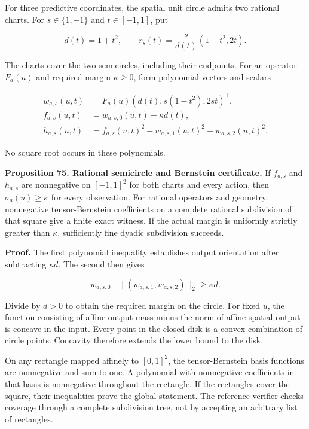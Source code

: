 For three predictive coordinates, the spatial unit circle admits two
rational charts. For \(s\in\{1,-1\}\) and \(t\in[-1,1]\), put

\[
d(t)=1+t^2,\qquad
r_s(t)=\frac{s}{d(t)}(1-t^2,2t).
\]

The charts cover the two semicircles, including their endpoints. For an
operator \(F_a(u)\) and required margin \(\kappa\geq0\), form polynomial
vectors and scalars

\[
\begin{aligned}
w_{a,s}(u,t)&=F_a(u)(d(t),s(1-t^2),2st)^{\mathsf T},\\
f_{a,s}(u,t)&=w_{a,s,0}(u,t)-\kappa d(t),\\
h_{a,s}(u,t)&=f_{a,s}(u,t)^2-w_{a,s,1}(u,t)^2-w_{a,s,2}(u,t)^2.
\end{aligned}
\]

No square root occurs in these polynomials.

\textbf{Proposition 75. Rational semicircle and Bernstein certificate.}
If \(f_{a,s}\) and \(h_{a,s}\) are nonnegative on \([-1,1]^2\) for both
charts and every action, then \(\sigma_a(u)\geq\kappa\) for every
observation. For rational operators and geometry, nonnegative
tensor-Bernstein coefficients on a complete rational subdivision of that
square give a finite exact witness. If the actual margin is uniformly
strictly greater than \(\kappa\), sufficiently fine dyadic subdivision
succeeds.

\textbf{Proof.} The first polynomial inequality establishes output
orientation after subtracting \(\kappa d\). The second then gives

\[
w_{a,s,0}-\|(w_{a,s,1},w_{a,s,2})\|_2\geq\kappa d.
\]

Divide by \(d>0\) to obtain the required margin on the circle. For fixed
\(u\), the function consisting of affine output mass minus the norm of
affine spatial output is concave in the input. Every point in the closed
disk is a convex combination of circle points. Concavity therefore
extends the lower bound to the disk.

On any rectangle mapped affinely to \([0,1]^2\), the tensor-Bernstein
basis functions are nonnegative and sum to one. A polynomial with
nonnegative coefficients in that basis is nonnegative throughout the
rectangle. If the rectangles cover the square, their inequalities prove
the global statement. The reference verifier checks coverage through a
complete subdivision tree, not by accepting an arbitrary list of
rectangles.


